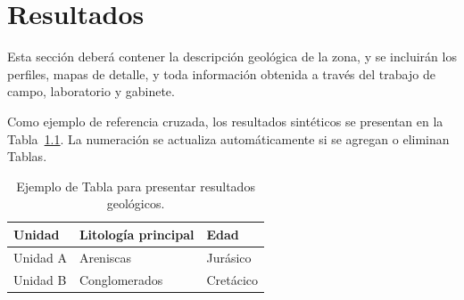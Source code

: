 \chapter{Resultados}
Esta sección deberá contener la descripción geológica de la zona, y se incluirán los perfiles, mapas de detalle, y toda información obtenida a través del trabajo de campo, laboratorio y gabinete.

Como ejemplo de referencia cruzada, los resultados sintéticos se presentan
en la Tabla~\ref{tab:ejemplo-resultados}. La numeración se actualiza
automáticamente si se agregan o eliminan Tablas.

\begin{table}[htbp]
  \centering
  \caption{Ejemplo de Tabla para presentar resultados geológicos.}
  \label{tab:ejemplo-resultados}
  \begin{tabular}{lll}
    \toprule
    Unidad & Litología principal & Edad \tabularnewline
    \midrule
    Unidad A & Areniscas & Jurásico \tabularnewline
    Unidad B & Conglomerados & Cretácico \tabularnewline
    \bottomrule
  \end{tabular}
\end{table}
